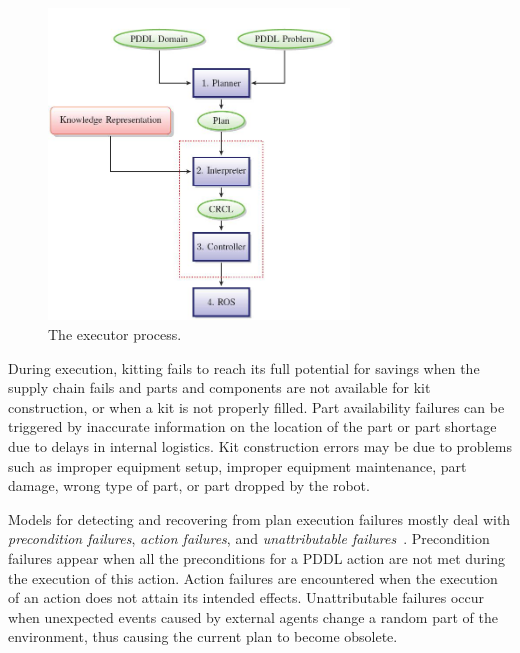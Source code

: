 \begin{figure}[ht]
\begin{center}
\includegraphics[width=8cm]{images/executordiag.jpg}
\caption{The executor process.}
\label{fig:executor}
\end{center}
\end{figure}

During execution, kitting fails to reach its full potential for savings when the supply chain fails and parts and components are not available for kit construction, or when a kit is not properly filled. Part availability failures can be triggered by inaccurate information on the location of the part or part shortage due to delays in internal logistics. Kit construction errors may be due to problems such as improper equipment setup, improper equipment maintenance, part damage, wrong type of part, or part dropped by the robot.


Models for detecting and recovering from plan execution failures mostly deal with \textit{precondition failures}, \textit{action failures}, and \textit{unattributable failures}~\cite{Myers1998}. Precondition failures appear when all the preconditions for a PDDL action are not met during the execution of this action. Action failures are encountered when the execution of an action does not attain its intended effects. Unattributable failures occur when unexpected events caused by external agents change a random part of the environment, thus causing the current plan to become obsolete.

